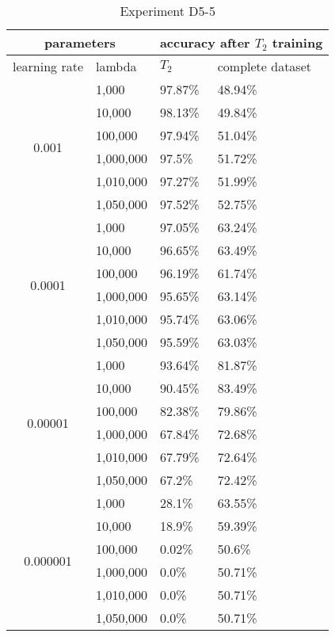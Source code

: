 \begin{table}[H]
    \centering
    \begin{tabular}{ |c|l|l|l|  }
        \hline
        \multicolumn{2}{|c|}{parameters} & \multicolumn{2}{c|}{accuracy after $T_2$ training} \\
        \hline
        learning rate & lambda & $T_2$ & complete dataset\\
        \hline
        \hline
        \multirow{6}{*}{0.001} & 1,000 & 97.87\% & 48.94\%\\
                            & 10,000 & 98.13\% & 49.84\%\\
                            & 100,000 & 97.94\% & 51.04\% \\
                            & 1,000,000 & 97.5\% & 51.72\% \\
                            & 1,010,000 & 97.27\% & 51.99\% \\
                            & 1,050,000 & 97.52\% & 52.75\% \\
        \hline
        \multirow{6}{*}{0.0001} & 1,000 & 97.05\% & 63.24\%\\
                                & 10,000 & 96.65\% & 63.49\%\\
                                & 100,000 & 96.19\% & 61.74\% \\
                                & 1,000,000 & 95.65\% & 63.14\% \\
                                & 1,010,000 & 95.74\% & 63.06\% \\
                                & 1,050,000 & 95.59\% & 63.03\% \\
        \hline
        \multirow{6}{*}{0.00001} & 1,000 & 93.64\% & 81.87\%\\
                                & 10,000 & 90.45\% & 83.49\%\\
                                & 100,000 & 82.38\% & 79.86\% \\
                                & 1,000,000 & 67.84\% & 72.68\% \\
                                & 1,010,000 & 67.79\% & 72.64\% \\
                                & 1,050,000 & 67.2\% & 72.42\% \\
        \hline
        \multirow{6}{*}{0.000001} & 1,000 & 28.1\% & 63.55\% \\
                                & 10,000 & 18.9\% & 59.39\% \\
                                & 100,000 & 0.02\% & 50.6\% \\
                                & 1,000,000 & 0.0\% & 50.71\% \\
                                & 1,010,000 & 0.0\% & 50.71\% \\
                                & 1,050,000 & 0.0\% & 50.71\% \\
        \hline
    \end{tabular}
    \caption{Experiment D5-5}
    \label{table:exp_d5-5}
\end{table}

